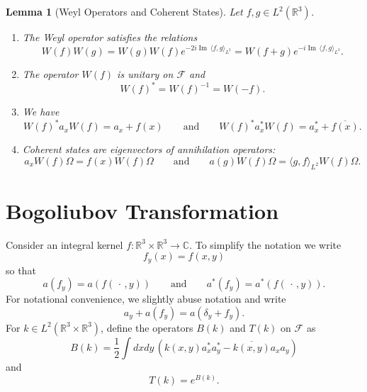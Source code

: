 \documentclass[11pt,a4paper,DIV11]{scrartcl}	%
\newtheorem{lem}[thm]{Lemma}
\newcommand{\R}{\mathds{R}}
\newcommand{\N}{\mathcal{N}}
\newcommand{\Rbb}{\mathbb{R}}		%
\newcommand{\Cbb}{\mathbb{C}}		%
\renewcommand{\Im}{\operatorname{Im}\,} 	%
\newcommand{\be}[1]{\begin{equation}\label{eq:#1}}	%
\newcommand{\ee}{\end{equation}}
\begin{document}
\begin{lem}[Weyl Operators and Coherent States] \label{l:W}
  Let $f, g \in L^2(\R^3)$.
  \begin{enumerate}
    \item \label{l:W1} The Weyl operator satisfies the relations
      \[
        W(f) W(g) = W(g) W(f) e^{-2i \Im \langle f, g \rangle_{L^2}} = W(f+g)
        e^{-i \Im \langle f, g \rangle_{L^2}}.
      \]
    \item \label{l:W2} The operator $W(f)$ is unitary on $\mathcal{F}$ and
      \[
        W(f)^* = W(f)^{-1} = W(-f).
      \]
    \item \label{l:W3} We have
      \[
        W(f)^* a_x W(f) = a_x + f(x) \qquad \text{and} \qquad W(f)^* a_x^*
        W(f) = a_x^* + \overline{f(x)}.
      \]
    \item \label{l:W4} Coherent states are
      eigenvectors of annihilation operators:
      \[
        a_x W(f)\Omega = f(x) W(f)\Omega \qquad \text{and} \qquad a(g) W(f)\Omega
        = \langle g, f \rangle_{L^2} W(f)\Omega.
      \]
\iffalse    \item \label{l:W5} The expectation of the number of particles in the
      coherent state $\psi(f)$ is given by $\| f \|_{L^2}^2$, that is,
      \[
        \langle \psi(f), \N^2 \psi(f) \rangle = \| f \|_{L^2}^2.
      \]
      Also the variance of the number of particles in $\psi(f)$ is given by
      $\| f \|_{L^2}$ (the distribution of $\N$ is poisson), that is,
      \[
        \langle \psi(f), \N^2 \psi(f) \rangle - \langle \psi(f), \N \psi(f)
        \rangle^2 = \| f \|_{L^2}^2.
      \]
    \item \label{l:W6} Coherent states are normalized but not orthogonal to
      each other. In fact,
      \[
        \langle \psi(f), \psi(g) \rangle = e^{-\frac{1}{2} (\| f \|_{L^2}^2 +
        \| g \|_{L^2}^2 - 2 \langle f, g \rangle_{L^2} )} \qquad \text{so
        that} \qquad |\langle \psi(f), \psi(g) \rangle| = e^{-\frac{1}{2} \| f
        - g \|_{L^2}^2}.
      \]\fi
  \end{enumerate}
\end{lem}


\section{Bogoliubov Transformation}
\label{s:bogoliubov}
Consider an integral kernel $f\colon \Rbb^3\times\Rbb^3 \to \Cbb$. To simplify the
notation we write
\be{no1}
  f_y(x) = f(x,y)
\ee
so that
\[
  a(f_y) = a(f(\,\cdot\,,y)) \qquad \text{and} \qquad a^*(f_y) =
  a^*(f(\,\cdot\,,y)).
\]
For notational convenience, we slightly abuse notation and write
\[
  a_y + a(f_y) = a(\delta_y + f_y).
\]
%
For $k \in L^2(\R^3 \times \R^3)$, define the operators $B(k)$ and $T(k)$ on
$\mathcal{F}$ as
\[
  B(k) = \frac{1}{2} \int dxdy \, (k(x,y) a_x^* a_y^* - \overline{k(x,y)} a_x
  a_y)
\]
and
\[
  T(k) = e^{B(k)}.
\]
\end{document}
